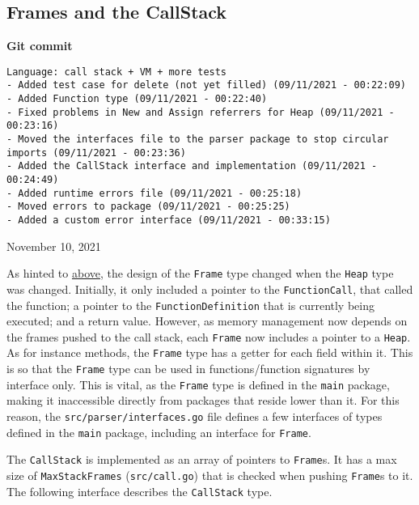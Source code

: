\subsection{Frames and the CallStack}
\label{sec:data-structures-frames-callstack}

\begin{center}
    \textbf{Git commit}
    \begin{verbatim}
Language: call stack + VM + more tests
- Added test case for delete (not yet filled) (09/11/2021 - 00:22:09)
- Added Function type (09/11/2021 - 00:22:40)
- Fixed problems in New and Assign referrers for Heap (09/11/2021 - 00:23:16)
- Moved the interfaces file to the parser package to stop circular imports (09/11/2021 - 00:23:36)
- Added the CallStack interface and implementation (09/11/2021 - 00:24:49)
- Added runtime errors file (09/11/2021 - 00:25:18)
- Moved errors to package (09/11/2021 - 00:25:25)
- Added a custom error interface (09/11/2021 - 00:33:15)
    \end{verbatim}
    \vspace{-1em}
    \tiny{November 10, 2021}
\end{center}

As hinted to \hyperref[sec:data-structures-heap]{above}, the design of the \verb|Frame| type changed when the \verb|Heap| type was changed. Initially, it only included a pointer to the \verb|FunctionCall|, that called the function; a pointer to the \verb|FunctionDefinition| that is currently being executed; and a return value. However, as memory management now depends on the frames pushed to the call stack, each \verb|Frame| now includes a pointer to a \verb|Heap|. As for instance methods, the \verb|Frame| type has a getter for each field within it. This is so that the \verb|Frame| type can be used in functions/function signatures by interface only. This is vital, as the \verb|Frame| type is defined in the \verb|main| package, making it inaccessible directly from packages that reside lower than it. For this reason, the \verb|src/parser/interfaces.go| file defines a few interfaces of types defined in the \verb|main| package, including an interface for \verb|Frame|.

The \verb|CallStack| is implemented as an array of pointers to \verb|Frame|s. It has a max size of \verb|MaxStackFrames| (\verb|src/call.go|) that is checked when pushing \verb|Frame|s to it. The following interface describes the \verb|CallStack| type.

\inputminted[firstline=62, lastline=73, autogobble, breaklines, tabsize=4]{go}{../../src/parser/interfaces.go}


